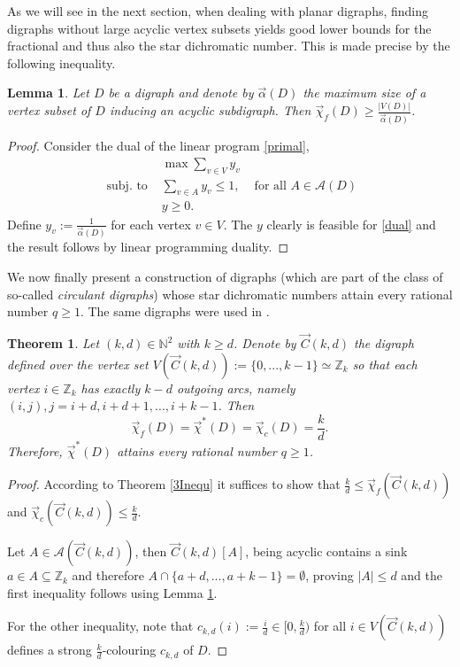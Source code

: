 \documentclass[fontsize=11pt,a4paper,DIV12]{scrartcl}
\theoremstyle{meiner}
\newtheorem{theorem}{Theorem}
\newtheorem{lemma}{Lemma}
\theoremstyle{definition}
\begin{document}
As we will see in the next section, when dealing with planar digraphs,
finding digraphs without large acyclic vertex subsets yields good
lower bounds for the fractional and thus also the star dichromatic
number. This is made precise by the following inequality.
\begin{lemma} \label{maxsize}
Let $D$ be a digraph and denote by $\vec{\alpha}(D)$ the maximum size of a vertex subset of $D$ inducing an acyclic subdigraph. Then $\vec{\chi}_f(D) \ge \frac{|V(D)|}{\vec{\alpha}(D)}$.
\end{lemma}
\begin{proof}
Consider the dual of the linear program \eqref{primal},
\begin{align}\label{dual}
&\max \sum_{v \in V}{y_v} \\
\text{ subj. to } &
\sum_{v \in A}{y_v} \leq 1, & \text{ for all } A \in \mathcal{A}(D) \nonumber\\
&y \ge 0.\nonumber
\end{align}
Define $y_v:=\frac{1}{\vec{\alpha}(D)}$ for each vertex $v \in V$. The $y$ clearly is feasible for \eqref{dual} and the result follows by linear programming duality. 
\end{proof}
We now finally present a construction of digraphs (which are part of
the class of so-called \emph{circulant digraphs}) whose star
dichromatic numbers attain every rational number $q \ge 1$. The same
digraphs were used in \cite{bokal}.
\begin{theorem}
Let $(k,d) \in \mathbb{N}^2$ with $k \ge d$. Denote by $\vec{C}(k,d)$ the digraph defined over the vertex set $V(\vec{C}(k,d)):=\{0,...,k-1\} \simeq \mathbb{Z}_k$ so that each vertex $i \in \mathbb{Z}_k$ has exactly $k-d$ outgoing arcs, namely $(i,j), j=i+d,i+d+1,...,i+k-1$. Then
$$\vec{\chi}_f(D) = \vec{\chi}^\ast(D) = \vec{\chi}_c(D)= \frac{k}{d}.$$
Therefore, $\vec{\chi}^\ast(D)$ attains every rational number $q \geq 1$.
\end{theorem}
\begin{proof}

  According to Theorem \ref{3Inequ} it suffices to show that
  $\frac{k}{d} \leq \vec{\chi}_f(\vec{C}(k,d))$ and
  $\vec{\chi}_c(\vec{C}(k,d)) \leq \frac{k}{d}$.  

Let $A \in
  \mathcal{A}(\vec{C}(k,d))$, then $\vec{C}(k,d)[A]$, being acyclic
  contains a sink $a \in A \subseteq \mathbb{Z}_k$ and therefore
  $A \cap \{a+d,...,a+k-1\}= \emptyset$, proving $|A| \le d$ and the first inequality follows using Lemma \ref{maxsize}.

  For the  other  inequality,  note that  $c_{k,d}(i):=\frac{i}{d} \in
  [0,\frac{k}{d})$  for all $i  \in  V(\vec{C}(k,d))$ defines a strong
  $\frac{k}{d}$-colouring $c_{k,d}$ of $D$.

\end{proof}
\end{document}
